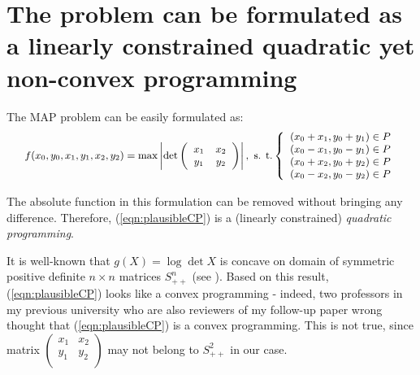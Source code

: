 \documentclass{ws-ijcga}
\begin{document}
\section{The problem can be formulated as a linearly constrained quadratic yet non-convex programming}\label{sect:address-cp}

The MAP problem can be easily formulated as:
\begin{equation}\label{eqn:plausibleCP}
\begin{small}
\begin{gathered}
  f(x_0,y_0,x_1,y_1,x_2,y_2)=\max \left|\det \left(
                                 \begin{array}{cc}
                                   x_1 & x_2 \\
                                   y_1 & y_2 \\
                                 \end{array}
                               \right) \right| ,
  \text{ s. t.} \left\{\begin{array}{c}
                        (x_0+x_1,y_0+y_1) \in P \\
                        (x_0-x_1,y_0-y_1) \in P \\
                        (x_0+x_2,y_0+y_2) \in P \\
                        (x_0-x_2,y_0-y_2) \in P
                      \end{array}\right.
\end{gathered}
\end{small}
\end{equation}

The absolute function in this formulation can be removed without bringing any difference.
  Therefore, (\ref{eqn:plausibleCP}) is a (linearly constrained) \emph{quadratic programming}.\medskip

It is well-known that $g(X) = \log \det X$ is concave on domain of symmetric positive definite $n\times n$ matrices $S^n_{++}$
(see \cite{ellipse-book-co}).
Based on this result, (\ref{eqn:plausibleCP}) looks like a convex programming - indeed, two professors in my previous university who are also reviewers of my follow-up paper
   wrong thought that (\ref{eqn:plausibleCP}) is a convex programming.
This is not true, since matrix $\left(\begin{array}{cc}x_1 & x_2 \\y_1 & y_2 \\\end{array}\right)$ may not belong to $S^2_{++}$ in our case.
\end{document}
